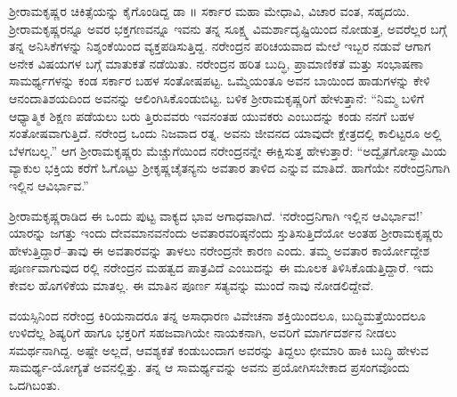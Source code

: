 ಶ್ರೀರಾಮಕೃಷ್ಣರ ಚಿಕಿತ್ಸೆಯನ್ನು ಕೈಗೊಂಡಿದ್ದ ಡಾ ॥ ಸರ್ಕಾರ ಮಹಾ ಮೇಧಾವಿ, ವಿಚಾರ ವಂತ, ಸಹೃದಯಿ. ಶ್ರೀರಾಮಕೃಷ್ಣರನ್ನೂ ಅವರ ಭಕ್ತಗಣವನ್ನೂ ಇವನು ತನ್ನ ಸೂಕ್ಷ್ಮ ವಿಮರ್ಶಾದೃಷ್ಟಿಯಿಂದ ನೋಡುತ್ತ, ಅವರೆಲ್ಲರ ಬಗ್ಗೆ ತನ್ನ ಅನಿಸಿಕೆಗಳನ್ನು ನಿಶ್ಶಂಕೆಯಿಂದ ವ್ಯಕ್ತಪಡಿಸುತ್ತಿದ್ದ. ನರೇಂದ್ರನ ಪರಿಚಯವಾದ ಮೇಲೆ ಇಬ್ಬರ ನಡುವೆ ಆಗಾಗ ಅನೇಕ ವಿಷಯಗಳ ಬಗ್ಗೆ ಮಾತುಕತೆ ನಡೆಯಿತು. ನರೇಂದ್ರನ ಹರಿತ ಬುದ್ಧಿ, ಪ್ರಾಮಾಣಿಕತೆ ಮತ್ತು ಸಂಭಾಷಣಾ ಸಾಮರ್ಥ್ಯಗಳನ್ನು ಕಂಡ ಸರ್ಕಾರ ಬಹಳ ಸಂತೋಷಪಟ್ಟ. ಒಮ್ಮೆಯಂತೂ ಅವನ ಬಾಯಿಂದ ಹಾಡುಗಳನ್ನು ಕೇಳಿ ಆನಂದಾತಿಶಯದಿಂದ ಅವನನ್ನು ಆಲಿಂಗಿಸಿಕೊಂಡುಬಿಟ್ಟ. ಬಳಿಕ ಶ್ರೀರಾಮಕೃಷ್ಣರಿಗೆ ಹೇಳುತ್ತಾನೆ: “ನಿಮ್ಮ ಬಳಿಗೆ ಆಧ್ಯಾತ್ಮಿಕ ಶಿಕ್ಷಣ ಪಡೆಯಲು ಬರು ತ್ತಿರುವವರು ಇವನಂತಹ ಯುವಕರು ಎಂಬುದನ್ನು ಕಂಡು ನನಗೆ ಬಹಳ ಸಂತೋಷವಾಗುತ್ತಿದೆ. ನರೇಂದ್ರ ಒಂದು ನಿಜವಾದ ರತ್ನ. ಅವನು ಜೀವನದ ಯಾವುದೇ ಕ್ಷೇತ್ರದಲ್ಲಿ ಕಾಲಿಟ್ಟರೂ ಅಲ್ಲಿ ಬೆಳಗಬಲ್ಲ.” ಆಗ ಶ್ರೀರಾಮಕೃಷ್ಣರು ಮೆಚ್ಚುಗೆಯಿಂದ ನರೇಂದ್ರನನ್ನೇ ಈಕ್ಷಿಸುತ್ತ ಹೇಳುತ್ತಾರೆ: “ಅದ್ವೈತಗೋಸ್ವಾಮಿಯ ವ್ಯಾಕುಲ ಭಕ್ತಿಯ ಕರೆಗೆ ಓಗೊಟ್ಟು ಶ್ರೀಕೃಷ್ಣಚೈತನ್ಯನು ಅವತಾರ ತಾಳಿದ ಎನ್ನುವ ಮಾತಿದೆ. ಹಾಗೆಯೇ ನರೇಂದ್ರನಿಗಾಗಿ ಇಲ್ಲಿನ ಆವಿರ್ಭಾವ.”

ಶ್ರೀರಾಮಕೃಷ್ಣರಾಡಿದ ಈ ಒಂದು ಪುಟ್ಟ ವಾಕ್ಯದ ಭಾವ ಅಗಾಧವಾಗಿದೆ. ‘ನರೇಂದ್ರನಿಗಾಗಿ ಇಲ್ಲಿನ ಆವಿರ್ಭಾವ!’ ಯಾರನ್ನು ಜಗತ್ತು ಇಂದು ದೇವಮಾನವನೆಂದು ಅವತಾರವರಿಷ್ಠನೆಂದು ಸ್ತುತಿಸುತ್ತಿದೆಯೋ ಅಂತಹ ಶ್ರೀರಾಮಕೃಷ್ಣರು ಹೇಳುತ್ತಿದ್ದಾರೆ–ತಾವು ಈ ಅವತಾರವನ್ನು ತಾಳಲು ನರೇಂದ್ರನೇ ಕಾರಣ ಎಂದು. ತಮ್ಮ ಅವತಾರ ಕಾರ್ಯೋದ್ದೇಶ ಪೂರ್ಣವಾಗುವುದ ರಲ್ಲಿ ನರೇಂದ್ರನ ಮಹತ್ವದ ಪಾತ್ರವಿದೆ ಎಂಬುದನ್ನು ಈ ಮೂಲಕ ತಿಳಿಸಿಕೊಡುತ್ತಿದ್ದಾರೆ. ಇದು ಕೇವಲ ಹೊಗಳಿಕೆಯ ಮಾತಲ್ಲ. ಈ ಮಾತಿನ ಪೂರ್ಣ ಸತ್ಯವನ್ನು ಮುಂದೆ ನಾವು ನೋಡಲಿದ್ದೇವೆ.

ವಯಸ್ಸಿನಿಂದ ನರೇಂದ್ರ ಕಿರಿಯನಾದರೂ ತನ್ನ ಅಸಾಧಾರಣ ವಿವೇಚನಾ ಶಕ್ತಿಯಿಂದಲೂ, ಬುದ್ಧಿಮತ್ತೆಯಿಂದಲೂ ಉಳಿದೆಲ್ಲ ಶಿಷ್ಯರಿಗೆ ಹಾಗೂ ಭಕ್ತರಿಗೆ ಸಹಜವಾಗಿಯೇ ನಾಯಕನಾಗಿ, ಅವರಿಗೆ ಮಾರ್ಗದರ್ಶನ ನೀಡಲು ಸಮರ್ಥನಾಗಿದ್ದ. ಅಷ್ಟೇ ಅಲ್ಲದೆ, ಆವಶ್ಯಕತೆ ಕಂಡುಬಂದಾಗ ಅವರನ್ನು ತಿದ್ದಲು ಛೀಮಾರಿ ಹಾಕಿ ಬುದ್ಧಿ ಹೇಳುವ ಸಾಮರ್ಥ್ಯ-ಯೋಗ್ಯತೆ ಅವನಲ್ಲಿತ್ತು. ತನ್ನ ಆ ಸಾಮರ್ಥ್ಯವನ್ನು ಅವನು ಪ್ರಯೋಗಿಸಬೇಕಾದ ಪ್ರಸಂಗವೊಂದು ಒದಗಿಬಂತು.

